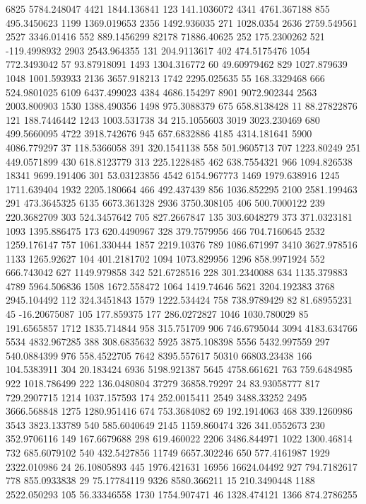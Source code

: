 6825	5784.248047
4421	1844.136841
123	141.1036072
4341	4761.367188
855	495.3450623
1199	1369.019653
2356	1492.936035
271	1028.0354
2636	2759.549561
2527	3346.01416
552	889.1456299
82178	71886.40625
252	175.2300262
521	-119.4998932
2903	2543.964355
131	204.9113617
402	474.5175476
1054	772.3493042
57	93.87918091
1493	1304.316772
60	49.60979462
829	1027.879639
1048	1001.593933
2136	3657.918213
1742	2295.025635
55	168.3329468
666	524.9801025
6109	6437.499023
4384	4686.154297
8901	9072.902344
2563	2003.800903
1530	1388.490356
1498	975.3088379
675	658.8138428
11	88.27822876
121	188.7446442
1243	1003.531738
34	215.1055603
3019	3023.230469
680	499.5660095
4722	3918.742676
945	657.6832886
4185	4314.181641
5900	4086.779297
37	118.5366058
391	320.1541138
558	501.9605713
707	1223.80249
251	449.0571899
430	618.8123779
313	225.1228485
462	638.7554321
966	1094.826538
18341	9699.191406
301	53.03123856
4542	6154.967773
1469	1979.638916
1245	1711.639404
1932	2205.180664
466	492.437439
856	1036.852295
2100	2581.199463
291	473.3645325
6135	6673.361328
2936	3750.308105
406	500.7000122
239	220.3682709
303	524.3457642
705	827.2667847
135	303.6048279
373	371.0323181
1093	1395.886475
173	620.4490967
328	379.7579956
466	704.7160645
2532	1259.176147
757	1061.330444
1857	2219.10376
789	1086.671997
3410	3627.978516
1133	1265.92627
104	401.2181702
1094	1073.829956
1296	858.9971924
552	666.743042
627	1149.979858
342	521.6728516
228	301.2340088
634	1135.379883
4789	5964.506836
1508	1672.558472
1064	1419.74646
5621	3204.192383
3768	2945.104492
112	324.3451843
1579	1222.534424
758	738.9789429
82	81.68955231
45	-16.20675087
105	177.859375
177	286.0272827
1046	1030.780029
85	191.6565857
1712	1835.714844
958	315.751709
906	746.6795044
3094	4183.634766
5534	4832.967285
388	308.6835632
5925	3875.108398
5556	5432.997559
297	540.0884399
976	558.4522705
7642	8395.557617
50310	66803.23438
166	104.5383911
304	20.183424
6936	5198.921387
5645	4758.661621
763	759.6484985
922	1018.786499
222	136.0480804
37279	36858.79297
24	83.93058777
817	729.2907715
1214	1037.157593
174	252.0015411
2549	3488.33252
2495	3666.568848
1275	1280.951416
674	753.3684082
69	192.1914063
468	339.1260986
3543	3823.133789
540	585.6040649
2145	1159.860474
326	341.0552673
230	352.9706116
149	167.6679688
298	619.460022
2206	3486.844971
1022	1300.46814
732	685.6079102
540	432.5427856
11749	6657.302246
650	577.4161987
1929	2322.010986
24	26.10805893
445	1976.421631
16956	16624.04492
927	794.7182617
778	855.0933838
29	75.17784119
9326	8580.366211
15	210.3490448
1188	2522.050293
105	56.33346558
1730	1754.907471
46	1328.474121
1366	874.2786255
